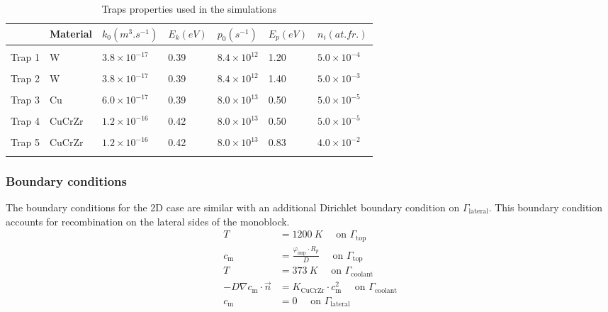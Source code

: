 \begin{table}
    \centering
    \begin{tabular}{L{1.5cm} L{1.5cm} R{1.6cm} R{1.1cm} R{1.6cm} R{1.1cm} R{2cm}}
         & Material & $k_0 (\si{m^3.s^{-1}})$ &  $E_k (\si{eV})$ & $p_0 (\si{s^{-1}})$ & $E_p (\si{eV})$ & $n_i (\si{at.fr.})$ \\
        \hline
        \\
        Trap 1 & W & $3.8 \times 10^{-17}$ & 0.39 & $8.4 \times 10^{12}$& 1.20 & $5.0 \times 10^{-4}$ \\
        \\
       Trap 2 & W & $3.8 \times 10^{-17}$ & 0.39 & $8.4 \times 10^{12}$& 1.40 & $5.0 \times 10^{-3}$ \\
        \\
        Trap 3 & Cu & $6.0 \times 10^{-17}$ & 0.39 & $8.0 \times 10^{13}$ & 0.50 &$5.0 \times 10^{-5}$\\
        \\
        Trap 4 & CuCrZr & $1.2\times 10^{-16}$ & 0.42 & $8.0 \times 10^{13}$ & 0.50 &$5.0 \times 10^{-5}$\\
        \\
        Trap 5 & CuCrZr & $1.2\times 10^{-16}$ & 0.42 & $8.0 \times 10^{13}$ & 0.83 &$4.0 \times 10^{-2}$\\
        \\
    \end{tabular}
    \caption{Traps properties used in the simulations \cite{hodille_macroscopic_2015, dolan_assessment_1994}}
    \label{tab:traps monoblock_1}
\end{table}


\subsubsection{Boundary conditions}

The boundary conditions for the 2D case are similar with an additional Dirichlet boundary condition on $\Gamma_\mathrm{lateral}$.
This boundary condition accounts for recombination on the lateral sides of the monoblock.
\begin{subequations}
    \begin{align}
        T &=  \SI{1200}{K}\quad \text { on } \Gamma_\mathrm{top}\\
        c_\mathrm{m} &=  \frac{\varphi_\mathrm{imp} \cdot R_p}{D}\quad \text { on } \Gamma_\mathrm{top}\\
        T &= \SI{373}{K}\quad \text { on } \Gamma_\mathrm{coolant}\\
        -D \nabla c_\mathrm{m} \cdot \vec{n} &= K_\mathrm{CuCrZr} \cdot c_\mathrm{m}^{2} \quad \text { on } \Gamma_\mathrm{coolant} \\
        c_\mathrm{m} &= 0 \quad \text { on } \Gamma_\mathrm{lateral}
    \end{align}
\end{subequations}

